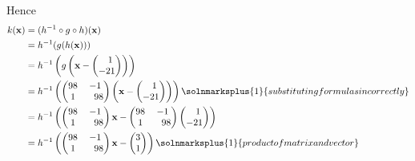Hence
\begin{align*}
	k(\mathbf{x}) & =(h^{-1}\circ g \circ h)(\mathbf{x})                \\ & =h^{-1}(g(h(\mathbf{x})))\\
	              & =h^{-1}\left( g \left(\mathbf{x}-
	                                                 \begin{pmatrix}
		                                                 \phantom{-} 1 \\-21
	                                                 \end{pmatrix}
	\right)\right)                                                      \\
	              & =h^{-1}\left(
	                             \begin{pmatrix}
		                             98 & -1 \\1 & \phantom{-} 98
	                             \end{pmatrix}
	\left(\mathbf{x}-
	                 \begin{pmatrix}
		                 \phantom{-} 1 \\-21
	                 \end{pmatrix}
	\right)\right)\solnmarksplus{1}{substituting formulas in correctly} \\
	              & =h^{-1}\left(
	                             \begin{pmatrix}
		                             98 & -1 \\1 & \phantom{-} 98
	                             \end{pmatrix}
	\mathbf{x}-
	           \begin{pmatrix}
		           98 & -1 \\1 & \phantom{-} 98
	           \end{pmatrix}
	\begin{pmatrix}
		\phantom{-} 1 \\-21
	\end{pmatrix}
	\right)                                                             \\
	              & =h^{-1}\left(
	                             \begin{pmatrix}
		                             98 & -1 \\1 & \phantom{-} 98
	                             \end{pmatrix}
	\mathbf{x}-
	           \begin{pmatrix}
		           3 \\1
	           \end{pmatrix}
	\right)\solnmarksplus{1}{product of matrix and vector}              \\
\end{align*}
